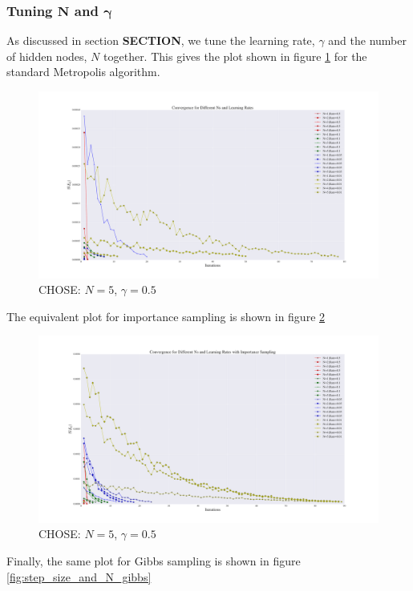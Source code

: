 \documentclass[a4paper, 10pt]{article}
\begin{document}
\subsubsection{Tuning $\boldsymbol{N}$ and $\boldsymbol{\gamma}$}
As discussed in section \textbf{SECTION}, we tune the learning rate, $\gamma$ and the number of hidden nodes, $N$ together. This gives the plot shown in figure \ref{fig:step_size_and_N_standard} for the standard Metropolis algorithm.
\begin{figure}
\centering
\includegraphics[width=\textwidth]{../Results/grad_normal.pdf}
\caption{CHOSE: $N=5$, $\gamma=0.5$}\label{fig:step_size_and_N_standard}
\end{figure}
The equivalent plot for importance sampling is shown in figure \ref{fig:step_size_and_N_importance}
\begin{figure}
	\centering
	\includegraphics[width=\textwidth]{../Results/grad_importance.pdf}
	\caption{CHOSE: $N=5$, $\gamma=0.5$}\label{fig:step_size_and_N_importance}
\end{figure}
Finally, the same plot for Gibbs sampling is shown in figure \ref{fig:step_size_and_N_gibbs}
\end{document}
